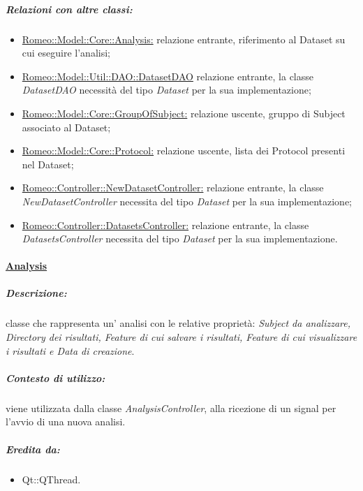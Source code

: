 			\subparagraph{Relazioni con altre classi:}
				\begin{itemize}
					\item \hyperref[analysis]{Romeo::Model::Core::Analysis:} relazione entrante, riferimento al Dataset\g{} su cui eseguire l'analisi;
				
					\item \hyperref[]{Romeo::Model::Util::DAO::DatasetDAO} relazione entrante, la classe \textsl{DatasetDAO} necessità del tipo \textsl{Dataset} per la sua implementazione;
					
					\item \hyperref[group]{Romeo::Model::Core::GroupOfSubject:} relazione uscente, gruppo di Subject\g{} associato al Dataset\g{};
					
					\item \hyperref[protocol]{Romeo::Model::Core::Protocol:} relazione uscente, lista dei Protocol\g{} presenti nel Dataset\g{};
					
					\item \hyperref[]{Romeo::Controller::NewDatasetController:} relazione entrante, la classe \textsl{NewDatasetController} necessita del tipo \textsl{Dataset} per la sua implementazione;
					
					\item \hyperref[]{Romeo::Controller::DatasetsController:} relazione entrante, la classe \textsl{DatasetsController} necessita del tipo \textsl{Dataset} per la sua implementazione.
	
				\end{itemize}

		\paragraph{\underline{Analysis}} 
		\label{analysis}
			\subparagraph{Descrizione:} classe che rappresenta un' analisi con le relative proprietà: \emph{Subject\g{} da analizzare, Directory dei risultati, Feature\g{} di cui salvare i risultati, Feature\g{} di cui visualizzare i risultati e Data di creazione}.

			\subparagraph{Contesto di utilizzo:} viene utilizzata dalla classe \textsl{AnalysisController}, alla ricezione di un signal\g{} per l'avvio di una nuova analisi.
		
		\subparagraph{Eredita da:}
			\begin{itemize}
				\item  Qt::QThread.
			\end{itemize}
			
